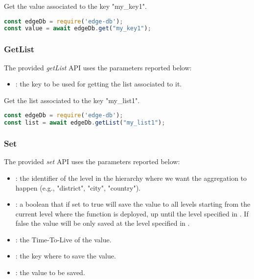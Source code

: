 \begin{example}
Get the value associated to the key "my\_key1".
\begin{lstlisting}[language=javascript]
const edgeDb = require('edge-db');
const value = await edgeDb.get("my_key1");
\end{lstlisting}
\end{example}


\subsubsection{GetList}
The provided \textit{getList} API uses the parameters reported below:

\begin{itemize}
    \item {}: the key to be used for getting the list associated to it.
\end{itemize}

\begin{example}
Get the list associated to the key "my\_list1".
\begin{lstlisting}[language=javascript]
const edgeDb = require('edge-db');
const list = await edgeDb.getList("my_list1");
\end{lstlisting}
\end{example}


\subsubsection{Set}
The provided \textit{set} API uses the parameters reported below:

\begin{itemize}
    \item {}: the identifier of the level in the hierarchy where we want the aggregation to happen (e.g., "district", "city", "country").
    \item {}: a boolean that if set to true will save the value to all levels starting from the current level where the function is deployed, up until the level specified in . If false the value will be only saved at the level specified in .
    \item {}: the Time-To-Live of the value.
    \item {}: the key where to save the value.
    \item {}: the value to be saved.
\end{itemize}

